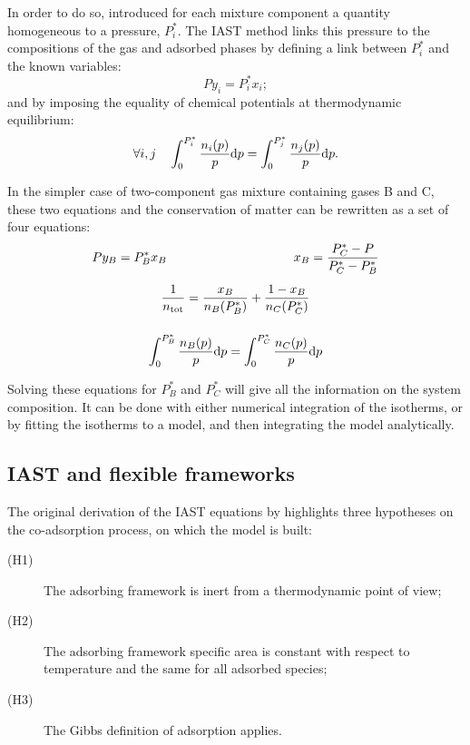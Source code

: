 \documentclass[thesis]{subfiles}
\begin{document}
In order to do so, \citeauthor{Myers1965}\cite{Myers1965} introduced for each
mixture component a quantity homogeneous to a pressure, $P_i^*$. The IAST method
links this pressure to the compositions of the gas and adsorbed phases by
defining a link between $P_i^*$ and the known variables:
\[P y_i = P_i^* x_i ;\label{eq:spreading}\]
and by imposing the equality of chemical potentials at thermodynamic equilibrium:
\[\label{eq:chem-pot} \forall i,j \quad \int_0^{P_i^*} \frac{n_i(p)}{p} \text{d} p = \int_0^{P_j^*} \frac{n_j(p)}{p} \text{d} p .\]

In the simpler case of two-component gas mixture containing gases B and C, these
two equations and the conservation of matter can be rewritten as a set of four
equations:
\[\begin{gathered}
    P y_B = P_B^* x_B \kern10em x_B = \frac{P_C^* - P}{P_C^* - P_B^*} \\[0.5em]
    \frac1{n_\text{tot}} = \frac{x_B}{n_B(P_B^*)} + \frac{1 - x_B}{n_C(P_C^*)} \\[1.2em]
    \label{eq:iast}\int_0^{P_B^*} \frac{n_B(p)}{p} \d p = \int_0^{P_C^*} \frac{n_C(p)}{p} \d p
\end{gathered}\]

Solving these equations for $P_B^*$ and $P_C^*$ will give all the information on
the system composition. It can be done with either numerical integration of the
isotherms, or by fitting the isotherms to a model, and then integrating the
model analytically.

\newpage
\subsection{IAST and flexible frameworks}

The original derivation of the IAST equations\cite{Myers1965} by
\citeauthor{Myers1965} highlights three hypotheses on the co-adsorption process,
on which the model is built:
\begin{description}
    \item[(H1)] The adsorbing framework is inert from a thermodynamic point of view;
    \item[(H2)] The adsorbing framework specific area is constant with respect to
                temperature and the same for all adsorbed species;
    \item[(H3)] The Gibbs definition of adsorption applies.
\end{description}
\end{document}

